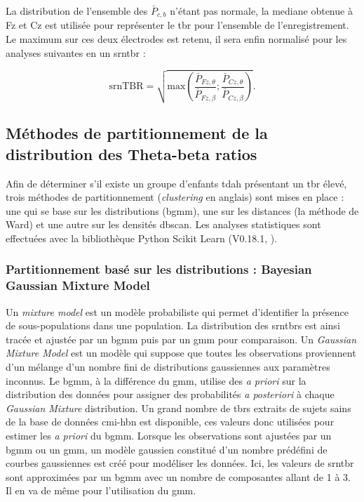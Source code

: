 La distribution de l'ensemble des $\bar{P}_{c,b}$ n'étant pas normale, la mediane obtenue à Fz et Cz est utilisée pour représenter le \gls{tbr} pour l'ensemble 
de l'enregistrement. Le maximum sur ces deux électrodes est retenu, il sera enfin normalisé pour les analyses suivantes en un \gls{srntbr} :

\begin{equation}
\label{eq:tbr_srntbr_computation}
\text{srnTBR} = \sqrt{ \text{max}(\frac{\bar{P}_{Fz,\theta}}{\bar{P}_{Fz,\beta} } ; \frac{\bar{P}_{Cz,\theta}}{\bar{P}_{Cz,\beta}} ) }.
\end{equation}

\subsection{Méthodes de partitionnement de la distribution des Theta-beta ratios} \label{clustering}

Afin de déterminer s'il existe un groupe d'enfants \gls{tdah} présentant un \gls{tbr} élevé, trois méthodes de partitionnement (\textit{clustering} en anglais) 
sont mises en place : une qui se base sur les distributions (\gls{bgmm}), une sur les distances (la méthode de Ward) et une autre sur 
les densités \gls{dbscan}. Les analyses statistiques sont effectuées avec la bibliothèque Python Scikit Learn (V0.18.1, \citet{Pedregosa2011}).

\subsubsection{Partitionnement basé sur les distributions : Bayesian Gaussian Mixture Model} 
Un \textit{mixture model} est un modèle probabiliste qui permet d'identifier la présence de sous-populations dans une population.
La distribution des \glspl{srntbr} est ainsi tracée et ajustée par un \gls{bgmm} \citep{Attias2000, Blei2006} puis par 
un \gls{gmm} pour comparaison. Un \textit{Gaussian Mixture Model} est un modèle qui suppose que toutes les observations proviennent d'un mélange 
d'un nombre fini de distributions gaussiennes aux paramètres inconnus. 
Le \gls{bgmm}, à la différence du \gls{gmm}, utilise des \textit{a priori} sur la distribution des données pour 
assigner des probabilités \textit{a posteriori} à chaque \textit{Gaussian Mixture} distribution. Un grand nombre de \glspl{tbr} 
extraits de sujets sains de la base de données \gls{cmi-hbn} est disponible, ces valeurs donc utilisées pour estimer les \textit{a priori} du \gls{bgmm}. 
Lorsque les observations sont ajustées par un \gls{bgmm} ou un \gls{gmm}, un modèle gaussien constitué d'un nombre prédéfini de courbes gaussiennes est 
créé pour modéliser les données. Ici, les valeurs de \gls{srntbr} sont approximées par un \gls{bgmm} avec un nombre de composantes allant de 1 à 3. 
Il en va de même pour l'utilisation du \gls{gmm}.

